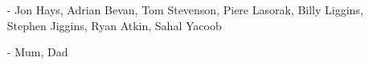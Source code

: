 \clearpage


\begin{acknowledgements}
\begin{itemize}
\item[-] Jon Hays, Adrian Bevan, Tom Stevenson, Piere Lasorak, Billy Liggins, Stephen Jiggins, Ryan Atkin, Sahal Yacoob
\item[-] Mum, Dad
\end{itemize}
\end{acknowledgements}

\clearpage